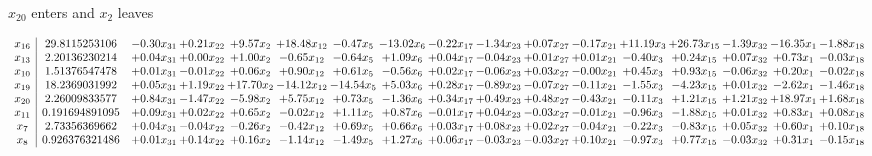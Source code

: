 \documentclass[9pt]{article}
\begin{document}
 $ x_{20} $ enters and $ x_{2} $ leaves 

 \[\begin{array}{c| c c@{\hskip 2pt} c@{\hskip 2pt} c@{\hskip 2pt} c@{\hskip 2pt} c@{\hskip 2pt} c@{\hskip 2pt} c@{\hskip 2pt} c@{\hskip 2pt} c@{\hskip 2pt} c@{\hskip 2pt} c@{\hskip 2pt} c@{\hskip 2pt} c@{\hskip 2pt} c@{\hskip 2pt} c@{\hskip 2pt} }
 x_{16}   &  29.8115253106 & -0.30 x_{31} & +  0.21 x_{22} & +  9.57 x_{2} & + 18.48 x_{12} & -0.47 x_{5} & -13.02 x_{6} & -0.22 x_{17} & -1.34 x_{23} & +  0.07 x_{27} & -0.17 x_{21} & + 11.19 x_{3} & + 26.73 x_{15} & -1.39 x_{32} & -16.35 x_{1} & -1.88 x_{18}\\
 x_{13}   &  2.20136230214 & +  0.04 x_{31} & +  0.00 x_{22} & +  1.00 x_{2} & -0.65 x_{12} & -0.64 x_{5} & +  1.09 x_{6} & +  0.04 x_{17} & -0.04 x_{23} & +  0.01 x_{27} & +  0.01 x_{21} & -0.40 x_{3} & +  0.24 x_{15} & +  0.07 x_{32} & +  0.73 x_{1} & -0.03 x_{18}\\
 x_{10}   &  1.51376547478 & +  0.01 x_{31} & -0.01 x_{22} & +  0.06 x_{2} & +  0.90 x_{12} & +  0.61 x_{5} & -0.56 x_{6} & +  0.02 x_{17} & -0.06 x_{23} & +  0.03 x_{27} & -0.00 x_{21} & +  0.45 x_{3} & +  0.93 x_{15} & -0.06 x_{32} & +  0.20 x_{1} & -0.02 x_{18}\\
 x_{19}   &  18.2369031992 & +  0.05 x_{31} & +  1.19 x_{22} & + 17.70 x_{2} & -14.12 x_{12} & -14.54 x_{5} & +  5.03 x_{6} & +  0.28 x_{17} & -0.89 x_{23} & -0.07 x_{27} & -0.11 x_{21} & -1.55 x_{3} & -4.23 x_{15} & +  0.01 x_{32} & -2.62 x_{1} & -1.46 x_{18}\\
 x_{20}   &  2.26009833577 & +  0.84 x_{31} & -1.47 x_{22} & -5.98 x_{2} & +  5.75 x_{12} & +  0.73 x_{5} & -1.36 x_{6} & +  0.34 x_{17} & +  0.49 x_{23} & +  0.48 x_{27} & -0.43 x_{21} & -0.11 x_{3} & +  1.21 x_{15} & +  1.21 x_{32} & + 18.97 x_{1} & +  1.68 x_{18}\\
 x_{11}   &  0.191694891095 & +  0.09 x_{31} & +  0.02 x_{22} & +  0.65 x_{2} & -0.02 x_{12} & +  1.11 x_{5} & +  0.87 x_{6} & -0.01 x_{17} & +  0.04 x_{23} & -0.03 x_{27} & -0.01 x_{21} & -0.96 x_{3} & -1.88 x_{15} & +  0.01 x_{32} & +  0.83 x_{1} & +  0.08 x_{18}\\
 x_{7}   &  2.73356369662 & +  0.04 x_{31} & -0.04 x_{22} & -0.26 x_{2} & -0.42 x_{12} & +  0.69 x_{5} & +  0.66 x_{6} & +  0.03 x_{17} & +  0.08 x_{23} & +  0.02 x_{27} & -0.04 x_{21} & -0.22 x_{3} & -0.83 x_{15} & +  0.05 x_{32} & +  0.60 x_{1} & +  0.10 x_{18}\\
 x_{8}   &  0.926376321486 & +  0.01 x_{31} & +  0.14 x_{22} & +  0.16 x_{2} & -1.14 x_{12} & -1.49 x_{5} & +  1.27 x_{6} & +  0.06 x_{17} & -0.03 x_{23} & -0.03 x_{27} & +  0.10 x_{21} & -0.97 x_{3} & +  0.77 x_{15} & -0.03 x_{32} & +  0.31 x_{1} & -0.15 x_{18}\\

\end{array}\]
\end{document}
